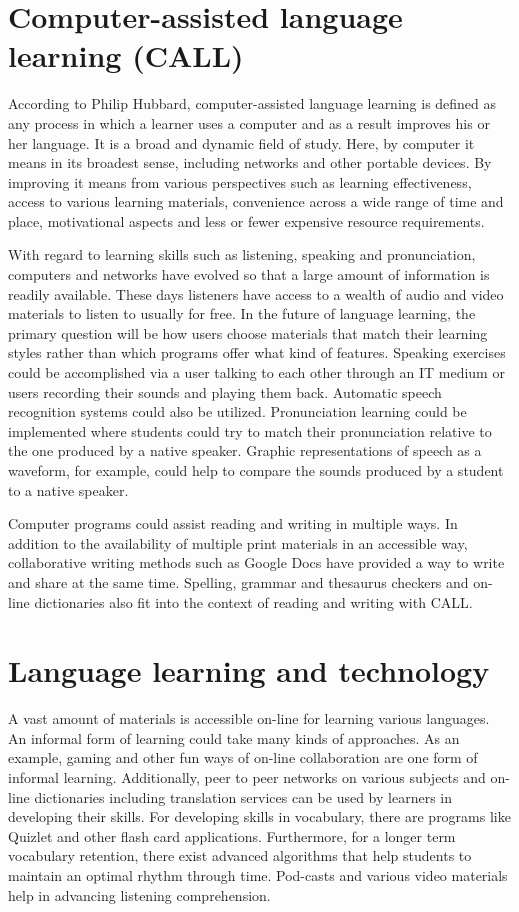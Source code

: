 \documentclass[11pt,a4paper,oneside,article]{memoir}
\begin{document}
\section{Computer-assisted language learning (CALL)}
According to Philip Hubbard, computer-assisted language learning is defined as any process in which a learner uses a computer and as a result improves his or her language. It is a broad and dynamic field of study. Here, by computer it means in its broadest sense, including networks and other portable devices. By improving it means from various perspectives such as learning effectiveness, access to various learning materials, convenience across a wide range of time and place, motivational aspects and less or fewer expensive resource requirements. \cite{hubbard}

With regard to learning skills such as listening, speaking and pronunciation, computers and networks have evolved so that a large amount of information is readily available. These days listeners have access to a wealth of audio and video materials to listen to usually for free. In the future of language learning, the primary question will be how users choose materials that match their learning styles rather than which programs offer what kind of features. Speaking exercises could be accomplished via a user talking to each other through an IT medium or users recording their sounds and playing them back. Automatic speech recognition systems could also be utilized. Pronunciation learning could be implemented where students could try to match their pronunciation relative to the one produced by a native speaker. Graphic representations of speech as a waveform, for example, could help to compare the sounds produced by a student to a native speaker. \cite{hubbard}

Computer programs could assist reading and writing in multiple ways. In addition to the availability of multiple print materials in an accessible way, collaborative writing methods such as Google Docs have provided a way to write and share at the same time. Spelling, grammar and thesaurus checkers and on-line dictionaries also fit into the context of reading and writing with CALL. \cite{hubbard}

\section{Language learning and technology}
A vast amount of materials is accessible on-line for learning various languages. An informal form of learning could take many kinds of approaches. As an example, gaming and other fun ways of on-line collaboration are one form of  informal learning. Additionally, peer to peer networks on various subjects and on-line dictionaries including translation services can be used by learners in developing their skills. For developing skills in vocabulary, there are programs like Quizlet and other flash card applications. Furthermore, for a longer term vocabulary retention, there exist advanced algorithms that help students to maintain an optimal rhythm through time. Pod-casts and various video materials help in advancing listening comprehension. 
\end{document}
